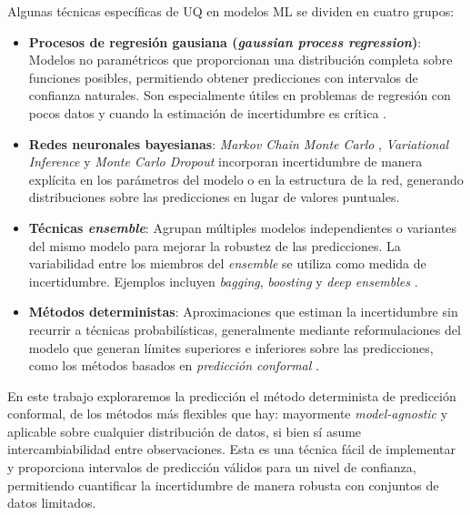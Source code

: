 Algunas técnicas específicas de \acrshort{UQ} en modelos \acrshort{ML} se dividen en cuatro grupos:

\begin{itemize}

    \item \textbf{Procesos de regresión gausiana (\textit{gaussian process regression})}: 
    Modelos no paramétricos que proporcionan una distribución completa sobre funciones posibles, permitiendo obtener predicciones con intervalos de confianza naturales. Son especialmente útiles en problemas de regresión con pocos datos y cuando la estimación de incertidumbre es crítica \cite{rasmussen2003}.

    \item \textbf{Redes neuronales bayesianas}: \textit{Markov Chain Monte Carlo} \cite{neal2012}, \textit{Variational Inference} \cite{blundell2015} y \textit{Monte Carlo Dropout} \cite{gal2016} incorporan incertidumbre de manera explícita en los parámetros del modelo o en la estructura de la red, generando distribuciones sobre las predicciones en lugar de valores puntuales.

    \item \textbf{Técnicas \textit{ensemble}}: Agrupan múltiples modelos independientes o variantes del mismo modelo para mejorar la robustez de las predicciones. La variabilidad entre los miembros del \textit{ensemble} se utiliza como medida de incertidumbre. Ejemplos incluyen \textit{bagging}, \textit{boosting} y \textit{deep ensembles} \cite{opitz1999}.

    \item \textbf{Métodos deterministas}: Aproximaciones que estiman la incertidumbre sin recurrir a técnicas probabilísticas, generalmente mediante reformulaciones del modelo que generan límites superiores e inferiores sobre las predicciones, como los métodos basados en \textit{predicción conformal} \cite{papadopoulos2002, sadinle2019, angelopoulos2021}.
    
\end{itemize}

En este trabajo exploraremos la predicción el método determinista de predicción conformal, de los métodos más flexibles que hay: mayormente \textit{model-agnostic} y aplicable sobre cualquier distribución de datos, si bien sí asume intercambiabilidad entre observaciones. Esta es una técnica fácil de implementar y proporciona intervalos de predicción válidos para un nivel de confianza, permitiendo cuantificar la incertidumbre de manera robusta con conjuntos de datos limitados. 
 
